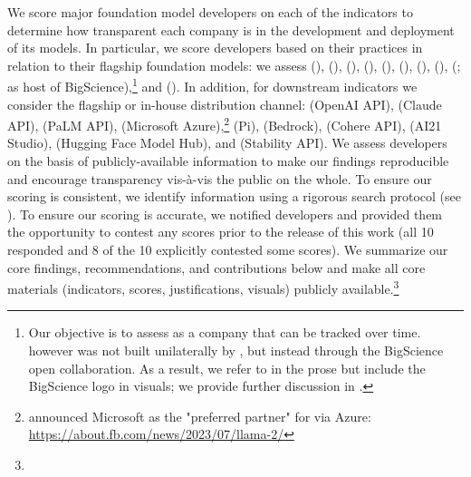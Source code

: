 We score \numcompanies major foundation model developers on each of the \numindicators indicators to determine how transparent each company is in the development and deployment of its models. 
In particular, we score developers based on their practices in relation to their flagship foundation models:
we assess \openai (\gptfour), \anthropic (\claude), \google (\palm), \meta (\llama), \inflection (\inflectionone), \amazon (\titan), \cohere (\command), \aitwentyone (\jurassic), \huggingface (\bloomz; as host of BigScience),\footnote{Our objective is to assess \huggingface as a company that can be tracked over time.
\bloomz however was not built unilaterally by \huggingface, but instead through the BigScience open collaboration. 
As a result, we refer to \huggingface in the prose but include the BigScience logo in visuals; we provide further discussion in .} and \stability (\stablediffusion). 
In addition, for downstream indicators we consider the flagship or in-house distribution channel: \openai (OpenAI API), \anthropic (Claude API), \google (PaLM API), \meta (Microsoft Azure),\footnote{\meta announced Microsoft as the "preferred partner" for \llama via Azure: \url{https://about.fb.com/news/2023/07/llama-2/}} \inflection (Pi), \amazon (Bedrock), \cohere (Cohere API), \aitwentyone (AI21 Studio), \huggingface (Hugging Face Model Hub), and \stability (Stability API).
We assess developers on the basis of publicly-available information to make our findings reproducible and encourage transparency vis-à-vis the public on the whole.
To ensure our scoring is consistent, we identify information using a rigorous search protocol (see ).
To ensure our scoring is accurate, we notified developers and provided them the opportunity to contest any scores prior to the release of this work (all 10 responded and 8 of the 10 explicitly contested some scores).
We summarize our core findings, recommendations, and contributions below and make all core materials (\eg indicators, scores, justifications, visuals) publicly available.\footnote{\materialsUrl}